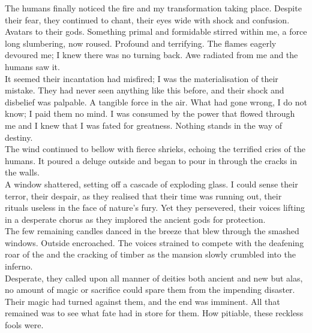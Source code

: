 
The humans finally noticed the fire and my transformation taking place. Despite their fear, they continued to chant, their eyes wide with shock and confusion. Avatars to their gods. Something primal and formidable stirred within me, a force long slumbering, now roused. Profound and terrifying. The flames eagerly devoured me; I knew there was no turning back. Awe radiated from me and the humans saw it. \\
It seemed their incantation had misfired; I was the materialisation of their mistake. They had never seen anything like this before, and their shock and disbelief was palpable. A tangible force in the air. What had gone wrong, I do not know; I paid them no mind. I was consumed by the power that flowed through me and I knew that I was fated for greatness. Nothing stands in the way of destiny. \\

The wind continued to bellow with fierce shrieks, echoing the terrified cries of the humans. It poured a deluge outside and began to pour in through the cracks in the walls. \\
A window shattered, setting off a cascade of exploding glass. I could sense their terror, their despair, as they realised that their time was running out, their rituals useless in the face of nature's fury. Yet they persevered, their voices lifting in a desperate chorus as they implored the ancient gods for protection. \\
The few remaining candles danced in the breeze that blew through the smashed windows. Outside encroached. The voices strained to compete with the deafening roar of the  and the cracking of timber as the mansion slowly crumbled into the inferno. \\
Desperate, they called upon all manner of deities both ancient and new but alas, no amount of magic or sacrifice could spare them from the impending disaster. Their magic had turned against them, and the end was imminent. All that remained was to see what fate had in store for them. How pitiable, these reckless fools were. \\

